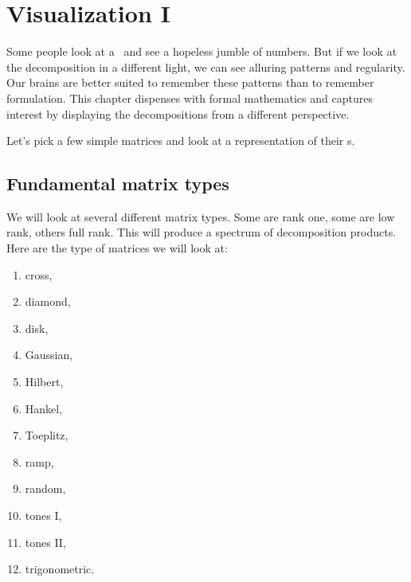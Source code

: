 \section{Visualization I}
Some people look at a \svdl \ and see a hopeless jumble of numbers. But if we look at the decomposition in a different light, we can see alluring patterns and regularity. Our brains are better suited to remember these patterns than to remember formulation. This chapter dispenses with formal mathematics and captures interest by displaying the decompositions from a different perspective.

Let's pick a few simple matrices and look at a representation of their \svdl s.

\subsection{Fundamental matrix types}
We will look at several different matrix types. Some are rank one, some are low rank, others full rank. This will produce a spectrum of decomposition products. Here are the type of matrices we will look at:
\begin{enumerate}
\item cross,
\item diamond,
\item disk,
\item Gaussian,
\item Hilbert,
\item Hankel,
\item Toeplitz,
\item ramp,
\item random,
\item tones I,
\item tones II,
\item trigonometric.
\end{enumerate}

